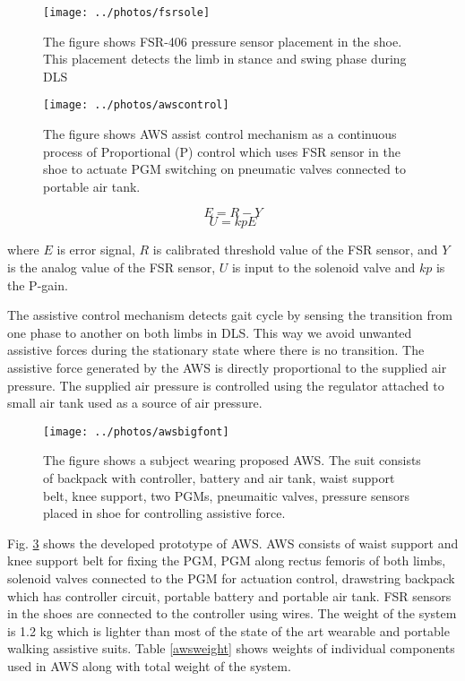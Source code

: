 \documentclass[letterpaper, 10 pt, conference]{ieeeconf}  %
\begin{document}
\begin{figure}
	\centering
	\texttt{[image: ../photos/fsrsole]}
	\caption{The figure shows FSR-406 pressure sensor placement in the shoe. This placement detects the limb in stance and swing phase during DLS}
	\label{fig:fsrsole}
\end{figure}

\begin{figure}
	\centering
	\texttt{[image: ../photos/awscontrol]}
	\caption{The figure shows AWS assist control mechanism as a continuous process of Proportional (P) control which uses FSR sensor in the shoe to actuate PGM switching on pneumatic valves connected to portable air tank.}
	\label{fig:awssystem}
\end{figure}
\begin{equation}\label{kevalue}
E = R - Y 
\end{equation}
\begin{equation}\label{uvalue}
U = kpE
\end{equation}

where $E$ is error signal, $R$ is calibrated threshold value of the FSR sensor, and $Y$ is the analog value of the FSR sensor, $U$ is input to the solenoid valve and $kp$ is the P-gain. 

The assistive control mechanism detects gait cycle by sensing the transition from one phase to another on both limbs in DLS. This way we avoid unwanted assistive forces during the stationary state where there is no transition. The assistive force generated by the AWS is directly proportional to the supplied air pressure. The supplied air pressure is controlled using the regulator attached to small air tank used as a source of air pressure.  

\begin{figure}
	\centering
	\texttt{[image: ../photos/awsbigfont]}
	\caption{The figure shows a subject wearing proposed AWS. The suit consists of backpack with controller, battery and air tank, waist support belt, knee support, two PGMs, pneumaitic valves, pressure sensors placed in shoe for controlling assistive force.}
	\label{fig:awsbigfont}
\end{figure}

Fig. \ref{fig:awsbigfont} shows the developed prototype of AWS. AWS consists of waist support and knee support belt for fixing the PGM, PGM along rectus femoris of both limbs, solenoid valves connected to the PGM for actuation control, drawstring backpack which has controller circuit, portable battery and portable air tank. FSR sensors in the shoes are connected to the controller using wires. The weight of the system is 1.2 kg which is lighter than most of the state of the art wearable and portable walking assistive suits. Table \ref{awsweight} shows weights of individual components used in AWS along with total weight of the system.
\end{document}
